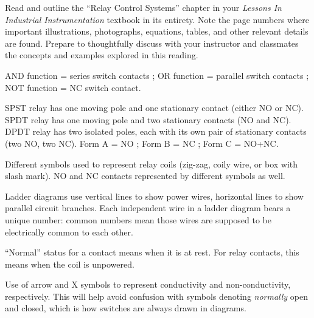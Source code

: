 

Read and outline the ``Relay Control Systems'' chapter in your {\it Lessons In Industrial Instrumentation} textbook in its entirety.  Note the page numbers where important illustrations, photographs, equations, tables, and other relevant details are found.  Prepare to thoughtfully discuss with your instructor and classmates the concepts and examples explored in this reading.














AND function = series switch contacts ; OR function = parallel switch contacts ; NOT function = NC switch contact.

\vskip 10pt

SPST relay has one moving pole and one stationary contact (either NO or NC).  SPDT relay has one moving pole and two stationary contacts (NO and NC).  DPDT relay has two isolated poles, each with its own pair of stationary contacts (two NO, two NC).  Form A = NO ; Form B = NC ; Form C = NO+NC.

Different symbols used to represent relay coils (zig-zag, coily wire, or box with slash mark).  NO and NC contacts represented by different symbols as well.

\vskip 10pt

Ladder diagrams use vertical lines to show power wires, horizontal lines to show parallel circuit branches.  Each independent wire in a ladder diagram bears a unique number: common numbers mean those wires are supposed to be electrically common to each other.

``Normal'' status for a contact means when it is at rest.  For relay contacts, this means when the coil is unpowered.

\vskip 10pt

Use of arrow and X symbols to represent conductivity and non-conductivity, respectively.  This will help avoid confusion with symbols denoting {\it normally} open and closed, which is how switches are always drawn in diagrams.


